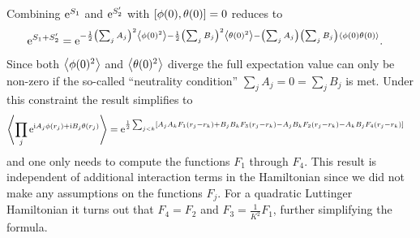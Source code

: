 \documentclass[english, parskip=full]{scrartcl}
\begin{document}
Combining $\powe{S_1}$ and $\powe{S_2'}$ with $\klb*{\phi(0),\theta(0)} = 0$ reduces to
\begin{align}
\powe{S_1+S_2'} &= \powe{-\frac{1}{2} \kla*{\sum_jA_j}^2 \bra*{\phi(0)^2} - \frac{1}{2} \kla*{\sum_jB_j}^2 \bra*{\theta(0)^2} - \kla*{\sum_jA_j}\kla*{\sum_jB_j} \bra*{\phi(0)\theta(0)}}.
\end{align}
Since both $\bra*{\phi(0)^2}$ and $\bra*{\theta(0)^2}$ diverge the full expectation value can only be non-zero if the so-called ``neutrality condition'' $\sum_j A_j = 0 = \sum_j B_j$ is met.
Under this constraint the result simplifies to
\begin{align}
\bra*{\prod_j \powe{\i A_j\phi(r_j) + \i B_j\theta(r_j)}} &= \powe{\frac{1}{2} \sum_{j<k} \klb*{A_jA_k F_1(r_j-r_k) + B_jB_kF_3(r_j-r_k) - A_jB_k F_2(r_j-r_k) - A_kB_j F_4(r_j-r_k)}}
\end{align}
and one only needs to compute the functions $F_1$ through $F_4$.
This result is independent of additional interaction terms in the Hamiltonian since we did not make any assumptions on the functions $F_j$.
For a quadratic Luttinger Hamiltonian it turns out that $F_4=F_2$ and $F_3 = \frac{1}{K^2} F_1$, further simplifying the formula.
\end{document}
